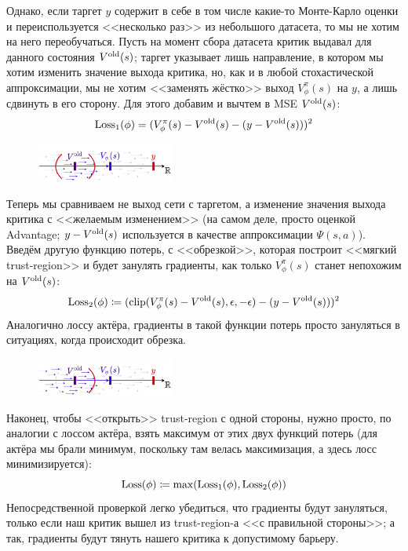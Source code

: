 Однако, если таргет $y$ содержит в себе в том числе какие-то Монте-Карло оценки и переиспользуется <<несколько раз>> из небольшого датасета, то мы не хотим на него переобучаться. Пусть на момент сбора датасета критик выдавал для данного состояния $V^{\mathrm{old}}(s)$; таргет указывает лишь направление, в котором мы хотим изменить значение выхода критика, но, как и в любой стохастической аппроксимации, мы не хотим <<заменять жёстко>> выход $V^{\pi}_{\phi}(s)$ на $y$, а лишь сдвинуть в его сторону. Для этого добавим и вычтем в MSE $V^{\mathrm{old}}(s)$:
$$\operatorname{Loss}_1(\phi) = (V^{\pi}_{\phi}(s) - V^{\mathrm{old}}(s) - (y - V^{\mathrm{old}}(s)))^2$$

\begin{figure}
\centering
\includegraphics[width=0.4\textwidth]{Images/ValueTrustRegion2.png}
\end{figure}
Теперь мы сравниваем не выход сети с таргетом, а изменение значения выхода критика с <<желаемым изменением>> (на самом деле, просто оценкой Advantage; $y - V^{\mathrm{old}}(s)$ используется в качестве аппроксимации $\Psi(s, a)$). Введём другую функцию потерь, с <<обрезкой>>, которая построит <<мягкий trust-region>> и будет занулять градиенты, как только $V^{\pi}_{\phi}(s)$ станет непохожим на $V^{\mathrm{old}}(s)$:
$$\operatorname{Loss}_2(\phi) \coloneqq (\mathrm{clip}(V^{\pi}_{\phi}(s) - V^{\mathrm{old}}(s), \epsilon, -\epsilon) - (y - V^{\mathrm{old}}(s)))^2$$
Аналогично лоссу актёра, градиенты в такой функции потерь просто зануляться в ситуациях, когда происходит обрезка.

\begin{figure}
\vspace{-0.7cm}
\centering
\includegraphics[width=0.4\textwidth]{Images/ValueTrustRegion3.png}
\end{figure}
Наконец, чтобы <<открыть>> trust-region с одной стороны, нужно просто, по аналогии с лоссом актёра, взять максимум от этих двух функций потерь (для актёра мы брали минимум, поскольку там велась максимизация, а здесь лосс минимизируется):
$$\operatorname{Loss}(\phi) \coloneqq \max(\operatorname{Loss}_1(\phi), \operatorname{Loss}_2(\phi))$$
Непосредственной проверкой легко убедиться, что градиенты будут зануляться, только если наш критик вышел из trust-region-а <<с правильной стороны>>; а так, градиенты будут тянуть нашего критика к допустимому барьеру.


